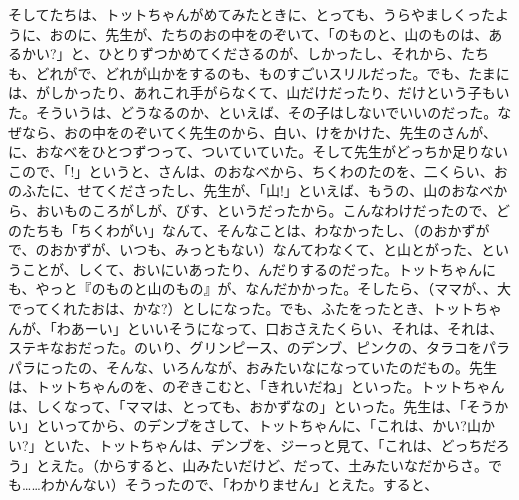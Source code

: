 そしてたちは、トットちゃんがめてみたときに、とっても、うらやましくったように、おのに、先生が、たちのおの中をのぞいて、「のものと、山のものは、あるかい?」と、ひとりずつかめてくださるのが、しかったし、それから、たちも、どれがで、どれが山かをするのも、ものすごいスリルだった。でも、たまには、がしかったり、あれこれ手がらなくて、山だけだったり、だけという子もいた。そういうは、どうなるのか、といえば、その子はしないでいいのだった。なぜなら、おの中をのぞいてく先生のから、白い、けをかけた、先生のさんが、に、おなべをひとつずつって、ついていていた。そして先生がどっちか足りないこので、「!」というと、さんは、のおなべから、ちくわのたのを、二くらい、おのふたに、せてくださったし、先生が、「山!」といえば、もうの、山のおなべから、おいものころがしが、びす、というだったから。こんなわけだったので、どのたちも「ちくわがい」なんて、そんなことは、わなかったし、（のおかずがで、のおかずが、いつも、みっともない）なんてわなくて、と山とがった、ということが、しくて、おいにいあったり、んだりするのだった。トットちゃんにも、やっと『のものと山のもの』が、なんだかかった。そしたら、（ママが、、大でってくれたおは、かな?）としになった。でも、ふたをったとき、トットちゃんが、「わあーい」といいそうになって、口おさえたくらい、それは、それは、ステキなおだった。のいり、グリンピース、のデンブ、ピンクの、タラコをパラパラにったの、そんな、いろんなが、おみたいなになっていたのだもの。先生は、トットちゃんのを、のぞきこむと、「きれいだね」といった。トットちゃんは、しくなって、「ママは、とっても、おかずなの」といった。先生は、「そうかい」といってから、のデンブをさして、トットちゃんに、「これは、かい?山かい?」といた、トットちゃんは、デンブを、ジーっと見て、「これは、どっちだろう」とえた。（からすると、山みたいだけど、だって、土みたいなだからさ。でも……わかんない）そうったので、「わかりません」とえた。すると、\ruby